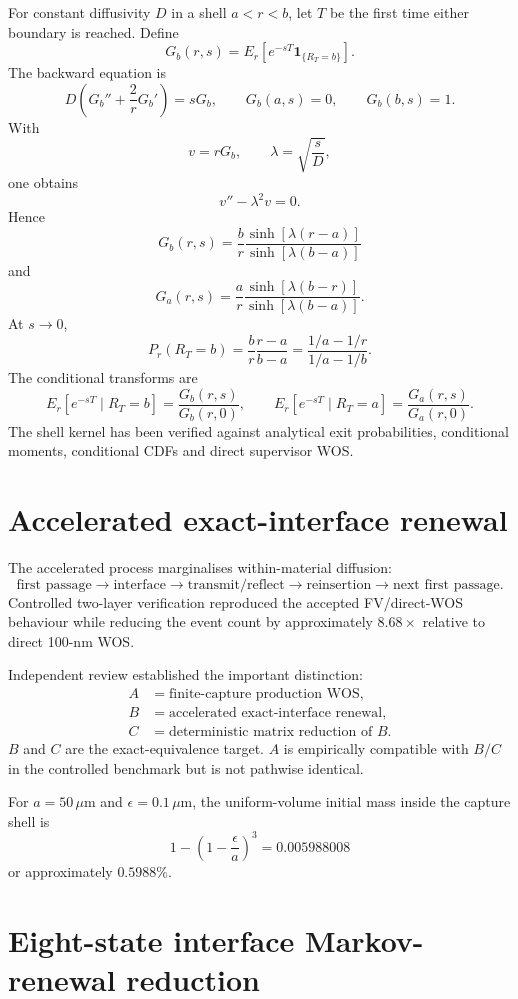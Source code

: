 \documentclass[11pt]{article}
\begin{document}
For constant diffusivity $D$ in a shell $a<r<b$, let $T$ be the first time either boundary is reached. Define
\[
G_b(r,s)=
E_r\!\left[e^{-sT}\mathbf 1_{\{R_T=b\}}\right].
\]
The backward equation is
\[
D\left(G_b''+\frac{2}{r}G_b'\right)=sG_b,
\qquad
G_b(a,s)=0,
\qquad
G_b(b,s)=1.
\]
With
\[
v=rG_b,
\qquad
\lambda=\sqrt{\frac{s}{D}},
\]
one obtains
\[
v''-\lambda^2v=0.
\]
Hence
\[
\boxed{
G_b(r,s)
=
\frac{b}{r}
\frac{\sinh[\lambda(r-a)]}
{\sinh[\lambda(b-a)]}
}
\]
and
\[
\boxed{
G_a(r,s)
=
\frac{a}{r}
\frac{\sinh[\lambda(b-r)]}
{\sinh[\lambda(b-a)]}
}.
\]
At $s\to0$,
\[
\boxed{
P_r(R_T=b)
=
\frac{b}{r}\frac{r-a}{b-a}
=
\frac{1/a-1/r}{1/a-1/b}
}.
\]
The conditional transforms are
\[
E_r[e^{-sT}\mid R_T=b]
=
\frac{G_b(r,s)}{G_b(r,0)},
\qquad
E_r[e^{-sT}\mid R_T=a]
=
\frac{G_a(r,s)}{G_a(r,0)}.
\]
The shell kernel has been verified against analytical exit probabilities, conditional moments, conditional CDFs and direct supervisor WOS.

\section{Accelerated exact-interface renewal}

The accelerated process marginalises within-material diffusion:
\[
\text{first passage}
\rightarrow
\text{interface}
\rightarrow
\text{transmit/reflect}
\rightarrow
\text{reinsertion}
\rightarrow
\text{next first passage}.
\]
Controlled two-layer verification reproduced the accepted FV/direct-WOS behaviour while reducing the event count by approximately $8.68\times$ relative to direct 100-nm WOS.

Independent review established the important distinction:
\begin{align*}
A&=\text{finite-capture production WOS},\\
B&=\text{accelerated exact-interface renewal},\\
C&=\text{deterministic matrix reduction of }B.
\end{align*}
$B$ and $C$ are the exact-equivalence target. $A$ is empirically compatible with $B/C$ in the controlled benchmark but is not pathwise identical.

For $a=50\,\mu\mathrm m$ and $\epsilon=0.1\,\mu\mathrm m$, the uniform-volume initial mass inside the capture shell is
\[
\boxed{
1-\left(1-\frac{\epsilon}{a}\right)^3
=
0.005988008
}
\]
or approximately $0.5988\%$.

\section{Eight-state interface Markov-renewal reduction}
\end{document}
